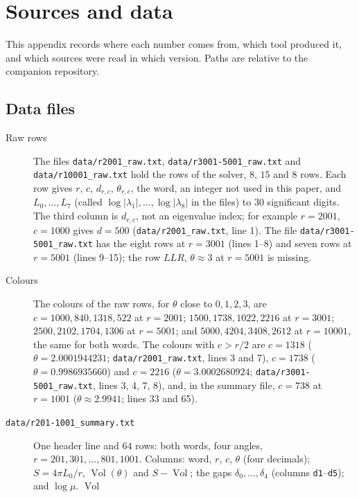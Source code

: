 \documentclass[11pt]{amsart}
\theoremstyle{definition}
\theoremstyle{remark}
\newcommand{\Vol}{\operatorname{Vol}}
\begin{document}
\section{Sources and data}\label{app:sources}

This appendix records where each number comes from, which tool produced it, and
which sources were read in which version. Paths are relative to the companion
repository.

\subsection{Data files}\label{app:data}
\begin{description}
\item[Raw rows] The files \texttt{data/r2001\_raw.txt},
\texttt{data/r3001-5001\_raw.txt} and \texttt{data/r10001\_raw.txt} hold the rows
of the solver, $8$, $15$ and $8$ rows. Each
row gives $r$, $c$, $d_{r,c}$, $\theta_{r,c}$, the word, an integer not used in this
paper, and $L_0, \dots, L_7$ (called $\log|\lambda_1|, \dots, \log|\lambda_8|$ in the
files) to $30$ significant digits. The third column is $d_{r,c}$, not an eigenvalue
index; for example $r = 2001$, $c = 1000$ gives $d = 500$
(\texttt{data/r2001\_raw.txt}, line 1). The file \texttt{data/r3001-5001\_raw.txt}
has the eight rows at $r = 3001$ (lines 1--8) and seven rows at $r = 5001$
(lines 9--15); the row $LLR$, $\theta \approx 3$ at $r = 5001$ is missing.
\item[Colours] The colours of the raw rows, for $\theta$ close to $0, 1, 2, 3$, are
$c = 1000, 840, 1318, 522$ at $r = 2001$; $1500, 1738, 1022, 2216$ at $r = 3001$;
$2500, 2102, 1704, 1306$ at $r = 5001$; and $5000, 4204, 3408, 2612$ at
$r = 10001$, the same for both words. The colours with $c > r/2$ are $c = 1318$
($\theta = 2.0001944231$; \texttt{data/r2001\_raw.txt}, lines 3 and 7), $c = 1738$
($\theta = 0.9986935660$) and $c = 2216$ ($\theta = 3.0002680924$;
\texttt{data/r3001-5001\_raw.txt}, lines 3, 4, 7, 8), and, in the summary file,
$c = 738$ at $r = 1001$ ($\theta \approx 2.9941$; lines 33 and 65).
\item[\texttt{data/r201-1001\_summary.txt}] One header line and $64$ rows: both words,
four angles, $r = 201, 301, \dots, 801, 1001$. Columns: word, $r$, $c$, $\theta$
(four decimals); $S = 4\pi L_0/r$, $\Vol(\theta)$ and $S - \Vol$; the gaps
$\delta_0, \dots, \delta_4$ (columns \texttt{d1}--\texttt{d5}); and $\log\mu$. $\Vol$

\end{description}
\end{document}
